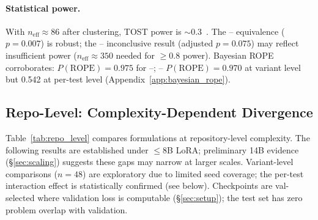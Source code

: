 \paragraph{Statistical power.} With $n_{\text{eff}} \approx 86$ after clustering, TOST power is ${\sim}$0.3~\cite{cohen1988}. The \cls{}--\cwm{} equivalence ($p{=}0.007$) is robust; the \cls{}--\traj{} inconclusive result (adjusted $p{=}0.075$) may reflect insufficient power ($n_{\text{eff}} \approx 350$ needed for ${\geq}$0.8 power). Bayesian ROPE corroborates: $P(\text{ROPE}){=}0.975$ for \cls{}--\cwm{}; \cls{}--\traj{} $P(\text{ROPE}){=}0.970$ at variant level but 0.542 at per-test level (Appendix~\ref{app:bayesian_rope}).


\subsection{Repo-Level: Complexity-Dependent Divergence}
\label{sec:repo}

Table~\ref{tab:repo_level} compares formulations at repository-level complexity. The following results are established under ${\leq}$8B LoRA; preliminary 14B evidence (\S\ref{sec:scaling}) suggests these gaps may narrow at larger scales. Variant-level comparisons ($n{=}48$) are exploratory due to limited seed coverage; the per-test interaction effect is statistically confirmed (see below). Checkpoints are val-selected where validation loss is computable (\S\ref{sec:setup}); the test set has zero problem overlap with validation.

